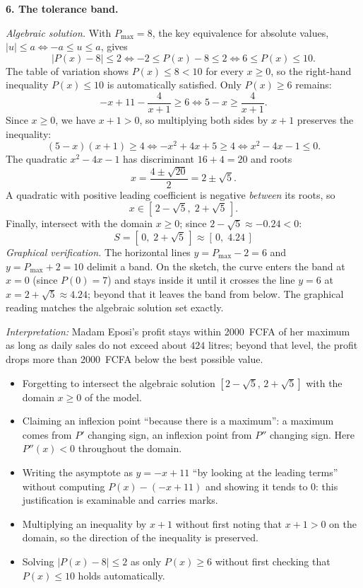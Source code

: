 \documentclass[11pt]{article}
\begin{document}
\textbf{6. The tolerance band.}\par
\emph{Algebraic solution.} With $P_{\max}=8$, the key equivalence for absolute values, $|u|\le a\iff -a\le u\le a$, gives
\[
|P(x)-8|\le 2\iff -2\le P(x)-8\le 2\iff 6\le P(x)\le 10.
\]
The table of variation shows $P(x)\le 8<10$ for every $x\ge 0$, so the right-hand inequality $P(x)\le 10$ is automatically satisfied. Only $P(x)\ge 6$ remains:
\[
-x+11-\frac{4}{x+1}\ge 6
\iff 5-x\ge \frac{4}{x+1}.
\]
Since $x\ge 0$, we have $x+1>0$, so multiplying both sides by $x+1$ preserves the inequality:
\[
(5-x)(x+1)\ge 4
\iff -x^{2}+4x+5\ge 4
\iff x^{2}-4x-1\le 0.
\]
The quadratic $x^{2}-4x-1$ has discriminant $16+4=20$ and roots
\[
x=\frac{4\pm\sqrt{20}}{2}=2\pm\sqrt{5}.
\]
A quadratic with positive leading coefficient is negative \emph{between} its roots, so
\[
x\in[\,2-\sqrt{5},\;2+\sqrt{5}\,].
\]
Finally, intersect with the domain $x\ge 0$; since $2-\sqrt{5}\approx -0.24<0$:
\[
\boxed{\,S=[\,0,\;2+\sqrt{5}\,]\approx[\,0,\;4.24\,]\,}
\]
\emph{Graphical verification.} The horizontal lines $y=P_{\max}-2=6$ and $y=P_{\max}+2=10$ delimit a band. On the sketch, the curve enters the band at $x=0$ (since $P(0)=7$) and stays inside it until it crosses the line $y=6$ at $x=2+\sqrt{5}\approx 4.24$; beyond that it leaves the band from below. The graphical reading matches the algebraic solution set exactly.

\emph{Interpretation:} Madam Eposi's profit stays within \SI{2000}{FCFA} of her maximum as long as daily sales do not exceed about $424$ litres; beyond that level, the profit drops more than \SI{2000}{FCFA} below the best possible value.

\begin{attention}
\begin{itemize}
\item Forgetting to intersect the algebraic solution $[2-\sqrt{5},\,2+\sqrt{5}]$ with the domain $x\ge 0$ of the model.
\item Claiming an inflexion point ``because there is a maximum'': a maximum comes from $P'$ changing sign, an inflexion point from $P''$ changing sign. Here $P''(x)<0$ throughout the domain.
\item Writing the asymptote as $y=-x+11$ ``by looking at the leading terms'' without computing $P(x)-(-x+11)$ and showing it tends to $0$: this justification is examinable and carries marks.
\item Multiplying an inequality by $x+1$ without first noting that $x+1>0$ on the domain, so the direction of the inequality is preserved.
\item Solving $|P(x)-8|\le 2$ as only $P(x)\ge 6$ without first checking that $P(x)\le 10$ holds automatically.
\end{itemize}
\end{attention}
\end{document}

